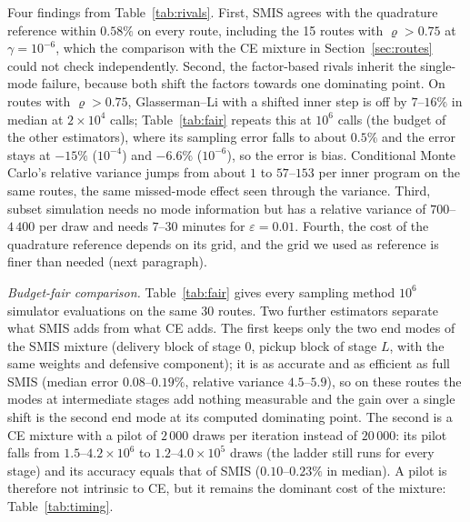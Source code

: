 \documentclass[ijoc,sglanonrev]{informs4}
\begin{document}
Four findings from Table~\ref{tab:rivals}. First, SMIS agrees with the
quadrature reference within $0.58\%$ on every route, including the 15 routes
with $\varrho>0.75$ at $\gamma=10^{-6}$, which the comparison with the CE
mixture in Section~\ref{sec:routes} could not check independently. Second,
the factor-based rivals inherit the single-mode failure, because both shift
the factors towards one dominating point. On routes with $\varrho>0.75$,
Glasserman--Li with a shifted inner step is off by $7$--$16\%$ in median at
$2\times10^4$ calls; Table~\ref{tab:fair} repeats this at $10^6$ calls (the
budget of the other estimators), where its sampling error falls to about
$0.5\%$ and the error stays at $-15\%$ ($10^{-4}$) and $-6.6\%$ ($10^{-6}$),
so the error is bias. Conditional Monte Carlo's relative variance jumps from
about $1$ to $57$--$153$ per inner program on the same routes, the same
missed-mode effect seen through the variance. Third, subset simulation needs
no mode information but has a relative variance of $700$--$4\,400$ per draw
and needs $7$--$30$ minutes for $\varepsilon=0.01$. Fourth, the cost of the
quadrature reference depends on its grid, and the grid we used as reference is
finer than needed (next paragraph).

\emph{Budget-fair comparison.} Table~\ref{tab:fair} gives every sampling
method $10^6$ simulator evaluations on the same 30 routes. Two further
estimators separate what SMIS adds from what CE adds. The first keeps only the
two end modes of the SMIS mixture (delivery block of stage $0$, pickup block of
stage $L$, with the same weights and defensive component); it is as accurate
and as efficient as full SMIS (median error $0.08$--$0.19\%$, relative
variance $4.5$--$5.9$), so on these routes the modes at intermediate stages
add nothing measurable and the gain over a single shift is the second end mode
at its computed dominating point. The second is a CE mixture with a pilot of
$2\,000$ draws per iteration instead of $20\,000$: its pilot falls from
$1.5$--$4.2\times10^6$ to $1.2$--$4.0\times10^5$ draws (the ladder still runs
for every stage) and its accuracy equals that of SMIS
($0.10$--$0.23\%$ in median). A pilot is therefore not intrinsic to CE, but
it remains the dominant cost of the mixture: Table~\ref{tab:timing}.
\end{document}
